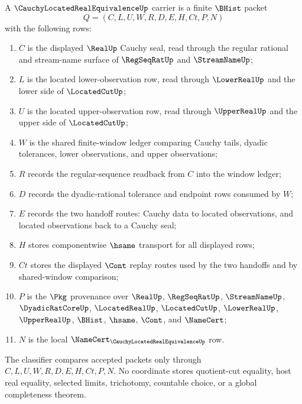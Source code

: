 \begin{definition}
\label{def:cauchy-located-real-equivalence-carrier}
A $\CauchyLocatedRealEquivalenceUp$ carrier is a finite $\BHist$ packet
$$
Q=(C,L,U,W,R,D,E,H,Ct,P,N)
$$
with the following rows:
\begin{enumerate}
\item $C$ is the displayed $\RealUp$ Cauchy seal, read through the regular rational and stream-name surface of $\RegSeqRatUp$ and $\StreamNameUp$;
\item $L$ is the located lower-observation row, read through $\LowerRealUp$ and the lower side of $\LocatedCutUp$;
\item $U$ is the located upper-observation row, read through $\UpperRealUp$ and the upper side of $\LocatedCutUp$;
\item $W$ is the shared finite-window ledger comparing Cauchy tails, dyadic tolerances, lower observations, and upper observations;
\item $R$ records the regular-sequence readback from $C$ into the window ledger;
\item $D$ records the dyadic-rational tolerance and endpoint rows consumed by $W$;
\item $E$ records the two handoff routes: Cauchy data to located observations, and located observations back to a Cauchy seal;
\item $H$ stores componentwise $\hsame$ transport for all displayed rows;
\item $Ct$ stores the displayed $\Cont$ replay routes used by the two handoffs and by shared-window comparison;
\item $P$ is the $\Pkg$ provenance over $\RealUp$, $\RegSeqRatUp$, $\StreamNameUp$, $\DyadicRatCoreUp$, $\LocatedRealUp$, $\LocatedCutUp$, $\LowerRealUp$, $\UpperRealUp$, $\BHist$, $\hsame$, $\Cont$, and $\NameCert$;
\item $N$ is the local $\NameCert_{\CauchyLocatedRealEquivalenceUp}$ row.
\end{enumerate}
The classifier compares accepted packets only through $C,L,U,W,R,D,E,H,Ct,P,N$. No coordinate stores quotient-cut equality, host real equality, selected limits, trichotomy, countable choice, or a global completeness theorem.
\end{definition}

